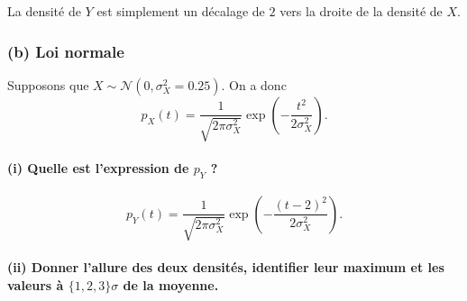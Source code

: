 \documentclass[11pt]{article}
\begin{document}
La densité de \(Y\) est simplement un décalage de \(2\) vers la droite
de la densité de \(X\).

    \hypertarget{b-loi-normale}{%
\subsubsection{(b) Loi normale}\label{b-loi-normale}}

Supposons que \(X\sim\mathcal{N}(0, \sigma_X^2=0.25)\). On a donc
\[p_X(t) = \frac{1}{\sqrt{2\pi\sigma_X^2}} \exp\left(-\frac{t^2}{2\sigma_X^2}\right).\]

\hypertarget{i-quelle-est-lexpression-de-p_y}{%
\paragraph{\texorpdfstring{(i) Quelle est l'expression de \(p_Y\)
?}{(i) Quelle est l'expression de p\_Y ?}}\label{i-quelle-est-lexpression-de-p_y}}

    \[p_Y(t) = \frac{1}{\sqrt{2\pi\sigma_X^2}} \exp\left(-\frac{(t-2)^2}{2\sigma_X^2}\right).\]

    \hypertarget{ii-donner-lallure-des-deux-densituxe9s-identifier-leur-maximum-et-les-valeurs-uxe0-123sigma-de-la-moyenne.}{%
\paragraph{\texorpdfstring{(ii) Donner l'allure des deux densités,
identifier leur maximum et les valeurs à \(\{1,2,3\}\sigma\) de la
moyenne.}{(ii) Donner l'allure des deux densités, identifier leur maximum et les valeurs à \textbackslash\{1,2,3\textbackslash\}\textbackslash sigma de la moyenne.}}\label{ii-donner-lallure-des-deux-densituxe9s-identifier-leur-maximum-et-les-valeurs-uxe0-123sigma-de-la-moyenne.}}
\end{document}
